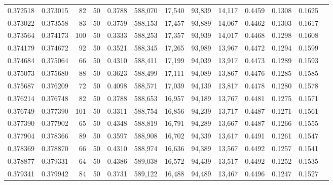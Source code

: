 \begin{tabular}{rrrrrrrrrrrrr}
0.372518 & 0.373015 &    82 &  50 &                                     0.3788 & 588,070 &  17,540 &  93,839 &  14,117 & 0.4459 & 0.1308 & 0.1625 \\
0.373022 & 0.373558 &    83 &  50 &                                     0.3759 & 588,153 &  17,457 &  93,889 &  14,067 & 0.4462 & 0.1303 & 0.1617 \\
0.373564 & 0.374173 &   100 &  50 &                                     0.3333 & 588,253 &  17,357 &  93,939 &  14,017 & 0.4468 & 0.1298 & 0.1608 \\
0.374179 & 0.374672 &    92 &  50 &                                     0.3521 & 588,345 &  17,265 &  93,989 &  13,967 & 0.4472 & 0.1294 & 0.1599 \\
0.374684 & 0.375064 &    66 &  50 &                                     0.4310 & 588,411 &  17,199 &  94,039 &  13,917 & 0.4473 & 0.1289 & 0.1593 \\
0.375073 & 0.375680 &    88 &  50 &                                     0.3623 & 588,499 &  17,111 &  94,089 &  13,867 & 0.4476 & 0.1285 & 0.1585 \\
0.375687 & 0.376209 &    72 &  50 &                                     0.4098 & 588,571 &  17,039 &  94,139 &  13,817 & 0.4478 & 0.1280 & 0.1578 \\
0.376214 & 0.376748 &    82 &  50 &                                     0.3788 & 588,653 &  16,957 &  94,189 &  13,767 & 0.4481 & 0.1275 & 0.1571 \\
0.376749 & 0.377390 &   101 &  50 &                                     0.3311 & 588,754 &  16,856 &  94,239 &  13,717 & 0.4487 & 0.1271 & 0.1561 \\
0.377390 & 0.377902 &    65 &  50 &                                     0.4348 & 588,819 &  16,791 &  94,289 &  13,667 & 0.4487 & 0.1266 & 0.1555 \\
0.377904 & 0.378366 &    89 &  50 &                                     0.3597 & 588,908 &  16,702 &  94,339 &  13,617 & 0.4491 & 0.1261 & 0.1547 \\
0.378369 & 0.378870 &    66 &  50 &                                     0.4310 & 588,974 &  16,636 &  94,389 &  13,567 & 0.4492 & 0.1257 & 0.1541 \\
0.378877 & 0.379331 &    64 &  50 &                                     0.4386 & 589,038 &  16,572 &  94,439 &  13,517 & 0.4492 & 0.1252 & 0.1535 \\
0.379341 & 0.379942 &    84 &  50 &                                     0.3731 & 589,122 &  16,488 &  94,489 &  13,467 & 0.4496 & 0.1247 & 0.1527 \\

\end{tabular}

